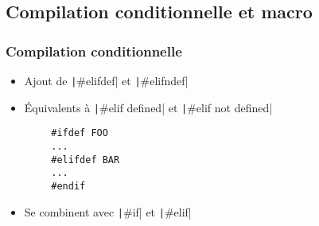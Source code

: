 \documentclass[C++.tex]{subfiles}
\begin{document}
\subsection*{Compilation conditionnelle et macro}
\begin{frame}[fragile]
	\frametitle{Compilation conditionnelle}
	\begin{itemize}
		\item Ajout de \texttt|#elifdef| et \texttt|#elifndef|
		\item Équivalents à \texttt|#elif defined| et \texttt|#elif not defined|
	\end{itemize}

	\begin{verbatim}
		#ifdef FOO
		...
		#elifdef BAR
		...
		#endif
	\end{verbatim}

	\begin{itemize}
		\item Se combinent avec \texttt|#if| et \texttt|#elif|
	\end{itemize}


\end{frame}
\end{document}
